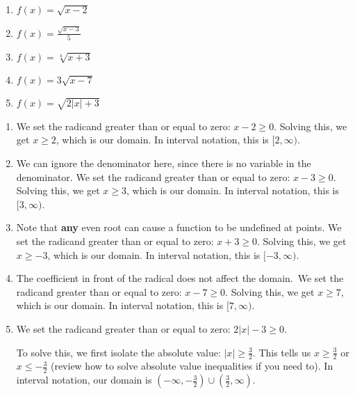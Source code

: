 \documentclass{ximera}
\begin{document}
\begin{enumerate}
	\item$f(x) = \sqrt{x - 2}$
	\item $f(x) = \frac{\sqrt{x - 3}}{5}$
	\item $f(x) = \sqrt[4]{x + 3}$
	\item $f(x) = 3\sqrt{x - 7}$
	\item $f(x) = \sqrt{2|x| + 3}$
\end{enumerate}

\begin{explanation}
\begin{enumerate}
	\item We set the radicand greater than or equal to zero: $x - 2 \ge 0$. Solving this, we get $x \ge 2$, which is our domain. In interval notation, this is $[2, \infty)$. 

	\item We can ignore the denominator here, since there is no variable in the denominator. We set the radicand greater than or equal to zero: $x - 3 \ge 0$. Solving this, we get $x \ge 3$, which is our domain. In interval notation, this is $[3, \infty)$. 
	\item Note that \textbf{any} even root can cause a function to be undefined at points. We set the radicand greater than or equal to zero: $x + 3 \ge 0$. Solving this, we get $x \ge -3$, which is our domain. In interval notation, this is $[-3, \infty)$.  

	\item The coefficient in front of the radical does not affect the domain. We set the radicand greater than or equal to zero: $x -7 \ge 0$. Solving this, we get $x \ge 7$, which is our domain. In interval notation, this is $[7, \infty)$. 

	\item We set the radicand greater than or equal to zero: $2|x| - 3 \ge 0$.

To solve this, we first isolate the absolute value: $|x| \ge \frac{3}{2}$. This tells us $x \ge \frac{3}{2}$ or $x \le -\frac{3}{2}$ (review how to solve absolute value inequalities if you need to). In interval notation, our domain is $\left(-\infty, -\frac{3}{2}\right) \cup \left(\frac{3}{2}, \infty\right)$.
\end{enumerate}
\end{explanation}

\end{document}
